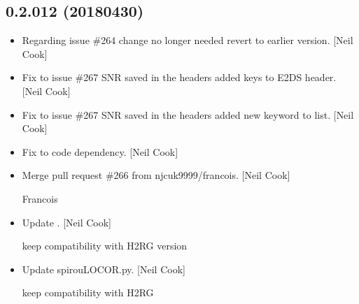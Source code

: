 \documentclass[a4paper,10pt,english]{report}
\begin{document}
\subsection{0.2.012 (2018\sphinxhyphen{}04\sphinxhyphen{}30)}
\label{\detokenize{misc/changelog:id466}}\begin{itemize}
\item {} 
Regarding issue \#264 \sphinxhyphen{} change no longer needed \sphinxhyphen{} revert to earlier
version. {[}Neil Cook{]}

\item {} 
Fix to issue \#267 \sphinxhyphen{} SNR saved in the headers \sphinxhyphen{} added keys to E2DS
header. {[}Neil Cook{]}

\item {} 
Fix to issue \#267 \sphinxhyphen{} SNR saved in the headers \sphinxhyphen{} added new keyword to
list. {[}Neil Cook{]}

\item {} 
Fix to code dependency. {[}Neil Cook{]}

\item {} 
Merge pull request \#266 from njcuk9999/francois. {[}Neil Cook{]}

Francois

\item {} 
Update . {[}Neil Cook{]}

keep compatibility with H2RG version

\item {} 
Update spirouLOCOR.py. {[}Neil Cook{]}

keep compatibility with H2RG

\end{itemize}
\end{document}
